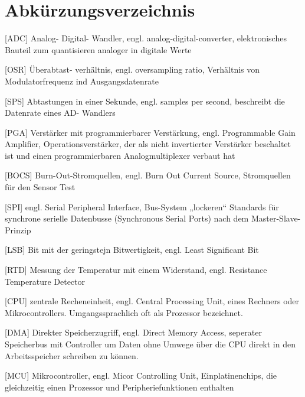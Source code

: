 \section*{Abkürzungsverzeichnis}


\begin{acronym}[HRTEM]

 [ADC] {Analog- Digital- Wandler, engl. \foreignlanguage{english}{analog-digital-converter}, elektronisches Bauteil zum quantisieren analoger in digitale Werte}

 [OSR] {Überabtast-
verhältnis, engl. \foreignlanguage{english}{oversampling ratio}, Verhältnis von Modulatorfrequenz ind Ausgangsdatenrate}

 [SPS] {Abtastungen in einer Sekunde, engl. \foreignlanguage{english}{samples per second}, beschreibt die Datenrate eines AD- Wandlers}

 [PGA] {Verstärker mit programmierbarer Verstärkung, engl. \foreignlanguage{english}{ Programmable Gain Amplifier},  Operationsverstärker, der als nicht invertierter Verstärker beschaltet ist und einen programmierbaren Analogmultiplexer verbaut hat}

 [BOCS] { Burn-Out-Stromquellen, engl. \foreignlanguage{english}{Burn Out Current Source}, Stromquellen für den Sensor Test}

 [SPI] {engl. \foreignlanguage{english}{Serial Peripheral Interface},  Bus-System „lockeren“ Standards für synchrone serielle Datenbusse (Synchronous Serial Ports) nach dem Master-Slave-Prinzip}

 [LSB] { Bit mit der geringstejn Bitwertigkeit, engl. \foreignlanguage{english}{Least Significant Bit}}

 [RTD] { Messung der Temperatur mit einem Widerstand, engl. \foreignlanguage{english}{Resistance Temperature Detector}}

 [CPU] { zentrale Recheneinheit, engl. \foreignlanguage{english}{Central Processing Unit}, eines Rechners oder Mikrocontrollers. Umgangssprachlich oft als Prozessor bezeichnet.}

 [DMA] { Direkter Speicherzugriff, engl. \foreignlanguage{english}{Direct Memory Access}, seperater Speicherbus mit Controller um Daten ohne Umwege über die CPU direkt in den Arbeitsspeicher schreiben zu können.}

 [MCU] { Mikrocontroller, engl. \foreignlanguage{english}{Micor Controlling Unit}, Einplatinenchips, die gleichzeitig einen Prozessor und Peripheriefunktionen enthalten}


\end{acronym}